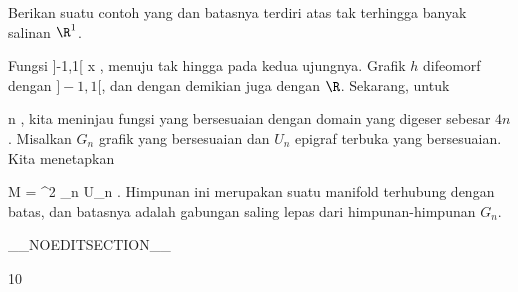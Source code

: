 {

Berikan suatu contoh
yang
dan batasnya terdiri atas
 {} {}
tak terhingga banyak salinan $\R^1$.

}
{

Fungsi
 {]-1,1[ } { \R
} { x } { {  }
} {,}
menuju tak hingga pada kedua ujungnya. Grafik $h$ difeomorf dengan $]-1,1[$, dan dengan demikian juga dengan $\R$. Sekarang, untuk

\mavergleichskette
{\vergleichskette
{ n
}
{ \in }{  \Z
}
{  }{
}
{    }{
}
{   }{
}
}
{}{}{}
, kita meninjau fungsi yang bersesuaian dengan domain yang digeser sebesar $4n$
\zusatzklammer {jadi dengan domain
\mathl{]4n-1,4n+1[}{}} {} {.}
Misalkan $G_n$ grafik yang bersesuaian dan $U_n$ epigraf terbuka
\zusatzklammer {!} {} {}
yang bersesuaian. Kita menetapkan

\mavergleichskettedisp
{\vergleichskette
{ M
}
{ =} { \R^2 \setminus \biguplus_{n \in \Z} U_n
}
{ } {
}
{ } {
}
{ } {
}
}
{}{}{.}
Himpunan ini merupakan suatu manifold terhubung dengan batas, dan batasnya adalah gabungan saling lepas dari himpunan-himpunan $G_n$.

 }

__NOEDITSECTION__

{10}

